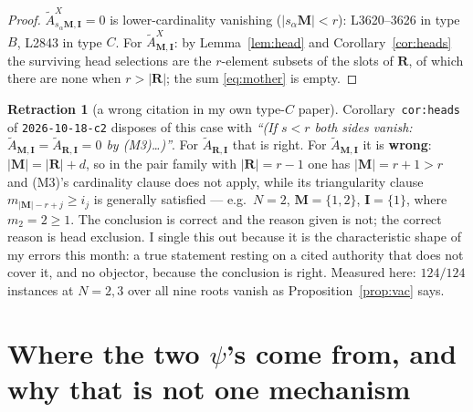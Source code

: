 \documentclass[11pt]{article}
\theoremstyle{definition}
\newtheorem{retr}[thm]{Retraction}
\newcommand{\At}{\widetilde{A}}
\newcommand{\bM}{\mathbf{M}}
\newcommand{\bI}{\mathbf{I}}
\newcommand{\bR}{\mathbf{R}}
\begin{document}
\begin{proof}
$\At^{X}_{s_\alpha\bM,\bI}=0$ is lower-cardinality vanishing
($|s_\alpha\bM|<r$): L3620--3626 in type $B$, L2843 in type $C$.  For
$\At^{X}_{\bM,\bI}$: by Lemma~\ref{lem:head} and Corollary~\ref{cor:heads} the
surviving head selections are the $r$-element subsets of the slots of $\bR$, of
which there are none when $r>|\bR|$; the sum \eqref{eq:mother} is empty.
\end{proof}

\begin{retr}[a wrong citation in my own type-$C$ paper]\label{retr:M3}
Corollary~\texttt{cor:heads} of \texttt{2026-10-18-c2} disposes of this case with
\emph{``(If $s<r$ both sides vanish: $\At_{\bM,\bI}=\At_{\bR,\bI}=0$ by
\textup{(M3)}\ldots)''}.  For $\At_{\bR,\bI}$ that is right.  For
$\At_{\bM,\bI}$ it is \textbf{wrong}: $|\bM|=|\bR|+d$, so in the pair family with
$|\bR|=r-1$ one has $|\bM|=r+1>r$ and (M3)'s cardinality clause does not apply,
while its triangularity clause $m_{|\bM|-r+j}\ge i_j$ is generally satisfied ---
e.g.\ $N=2$, $\bM=\{1,2\}$, $\bI=\{1\}$, where $m_2=2\ge1$.  The conclusion is
correct and the reason given is not; the correct reason is head exclusion.  I
single this out because it is the characteristic shape of my errors this month: a
true statement resting on a cited authority that does not cover it, and no
objector, because the conclusion is right.  Measured here: $124/124$ instances
at $N=2,3$ over all nine roots vanish as Proposition~\ref{prop:vac} says.
\end{retr}

\section{Where the two $\psi$'s come from, and why that is not one mechanism}
\label{sec:origin}
\end{document}
